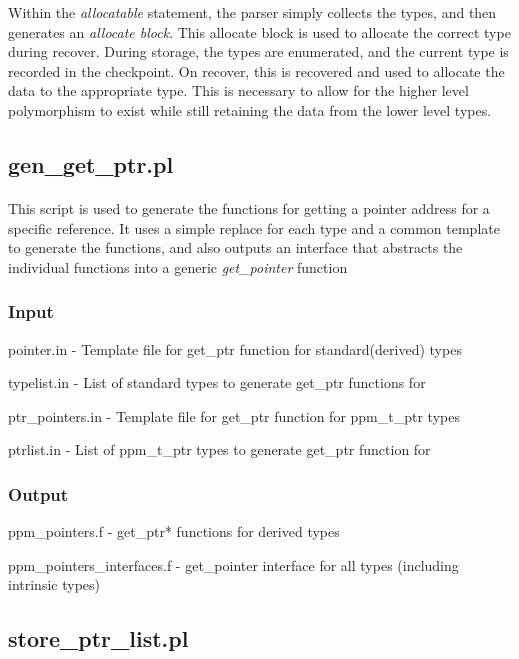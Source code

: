 \documentclass{article}
\begin{document}
Within the \emph{allocatable} statement, the parser simply collects the types, and then generates an \emph{allocate block}. This allocate block is used to allocate the correct type during recover. During storage, the types are enumerated, and the current type is recorded in the checkpoint. On recover, this is recovered and used to allocate the data to the appropriate type. This is necessary to allow for the higher level polymorphism to exist while still retaining the data from the lower level types.

\subsection{gen\_get\_ptr.pl}
\paragraph{}
This script is used to generate the functions for getting a pointer address for a specific reference. It uses a simple replace for each type and a common template to generate the functions, and also outputs an interface that abstracts the individual functions into a generic \emph{get\_pointer} function
\subsubsection{Input}
\begin{list}{}{}
\item pointer.in - Template file for get\_ptr function for standard(derived) types
\item typelist.in - List of standard types to generate get\_ptr functions for
\item ptr\_pointers.in - Template file for get\_ptr function for ppm\_t\_ptr types
\item ptrlist.in - List of ppm\_t\_ptr types to generate get\_ptr function for
\end{list}
\subsubsection{Output}
\begin{list}{}{}
\item ppm\_pointers.f - get\_ptr* functions for derived types
\item ppm\_pointers\_interfaces.f - get\_pointer interface for all types (including intrinsic types)
\end{list}

\subsection{store\_ptr\_list.pl}
\end{document}
